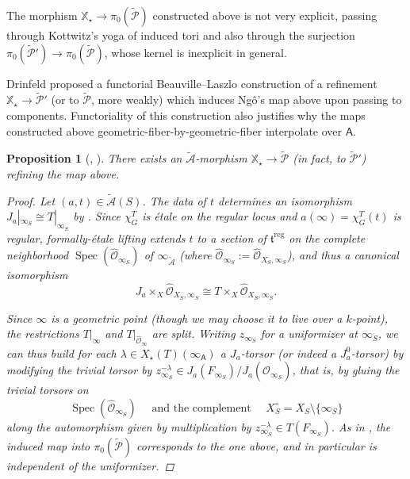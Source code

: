 \documentclass[openany]{amsbook}
\newtheorem{proposition}[theorem]{Proposition}
\theoremstyle{definition}
\theoremstyle{remark}
\numberwithin{equation}{section}
\renewcommand{\O}{\mathcal{O}}
\newcommand{\cA}{\mathcal{A}}
\newcommand{\cP}{\mathcal{P}}
\renewcommand{\-}{\operatorname{-}}
\newcommand{\Spec}{\operatorname{Spec}}
\newcommand{\on}[1]{\operatorname{#1}}
\newcommand{\reg}{\on{reg}}
\newcommand{\ctA}{\widetilde{\cA}}
\newcommand{\ctP}{\widetilde{\cP}}
\newcommand{\bA}{\mathsf{A}}
\newcommand{\bX}{\mathbb{X}}
\newcommand{\ft}{\mathfrak{t}}
\begin{document}
The morphism $\bX_\star \to \pi_0(\ctP)$ constructed above is not very explicit, passing through Kottwitz's yoga of induced tori and also through the surjection $\pi_0(\ctP') \to \pi_0(\ctP)$, whose kernel is inexplicit in general. 

Drinfeld proposed a functorial Beauville--Laszlo construction of a refinement $\bX_\star \to \ctP'$ (or to $\ctP$, more weakly) which induces Ng\^{o}'s map above upon passing to components. Functoriality of this construction also justifies why the maps constructed above geometric-fiber-by-geometric-fiber interpolate over $\bA$.



\begin{proposition}[{{\cite[\S 7.3]{CLII}, \cite[6.8]{ngoendo}}}]\label{prop.inv.map.BL}
    There exists an $\ctA$-morphism $\bX_\star \to \ctP$ (in fact, to $\ctP'$) refining the map above. 
    \begin{proof}
        Let $(a,t) \in \ctA(S)$. The data of $t$ determines an isomorphism $J_a|_{\infty_S} \cong T|_{\infty_S}$ by \cite[2.1.1]{ngofl}. Since $\chi^T_G$ is \'etale on the regular locus and $a(\infty) = \chi^T_G(t)$ is regular, formally-\'etale lifting extends $t$ to a section of $\ft^{\reg}$ on the complete neighborhood $\Spec(\widehat{\O}_{\infty_S})$ of $\infty_{\ctA}$ (where $\widehat{\O}_{\infty_S} := \widehat{\O}_{X_S, \infty_S}$), and thus a canonical isomorphism
        $$
            J_a \times_X \widehat{\O}_{X_S, \infty_S} \cong T \times_X \widehat{\O}_{X_S, \infty_S}.
        $$
        
        Since $\infty$ is a geometric point (though we may choose it to live over a $k$-point), the restrictions $T|_{\infty}$ and $T|_{\widehat{\O}_{\infty}}$ are split. Writing $z_{\infty_S}$ for a uniformizer at $\infty_S$, we can thus build for each $\lambda \in X_\star(T)(\infty_{\bA})$ a $J_a$-torsor (or indeed a $J_a^0$-torsor) by modifying the trivial torsor by $z_{\infty_S}^{-\lambda} \in J_a(F_{\infty_S})/J_a(\widehat{\O}_{\infty_S})$, that is, by gluing the trivial torsors on 
        $$
        \Spec(\widehat{\O}_{\infty_S}) \quad \text{ and the complement } \quad X_S^\circ = X_S \setminus \{\infty_S\}
        $$
        along the automorphism given by multiplication by $z_{\infty_S}^{-\lambda} \in T(F_{\infty_S})$. As in \cite[6.8]{ngoendo}, the induced map into $\pi_0(\ctP)$ corresponds to the one above, and in particular is independent of the uniformizer. 
    \end{proof}
\end{proposition}
\end{document}
